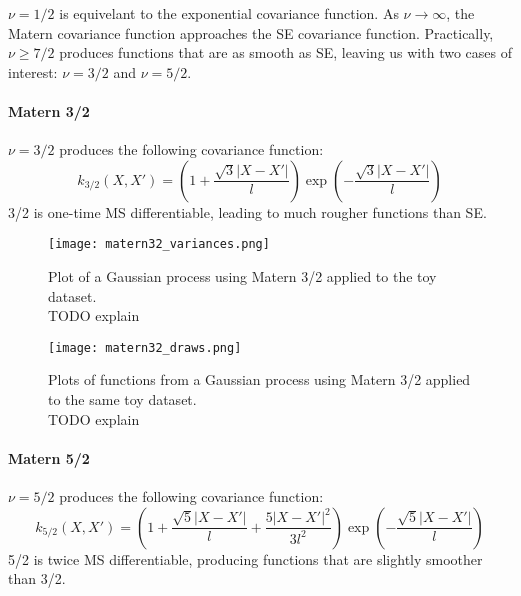 $\nu = 1/2$ is equivelant to the exponential covariance function. As $\nu \to \infty$, the Matern covariance function approaches the SE covariance function. Practically, $\nu \geq 7/2$ produces functions that are as smooth as SE, leaving us with two cases of interest: $\nu = 3/2$ and $\nu = 5/2$.

\paragraph{Matern 3/2}
$\nu = 3/2$ produces the following covariance function:
\begin{equation*}
    k_{3/2}(X,X') = \left(1 + \frac{\sqrt{3}|X - X'|}{l} \right) \exp \left(-\frac{\sqrt{3}|X - X'|}{l} \right)
\end{equation*}
3/2 is one-time MS differentiable, leading to much rougher functions than SE.

\begin{figure}[H]
    \texttt{[image: matern32\_variances.png]}
    \caption{
        Plot of a Gaussian process using Matern 3/2 applied to the toy dataset. \\
        TODO explain
    }
\end{figure}

\begin{figure}[H]
    \texttt{[image: matern32\_draws.png]}
    \caption{
        Plots of functions from a Gaussian process using Matern 3/2 applied to the same toy dataset. \\
        TODO explain
    }
\end{figure}


\paragraph{Matern 5/2}
$\nu = 5/2$ produces the following covariance function:
\begin{equation*}
    k_{5/2}(X,X') = \left(1 + \frac{\sqrt{5}|X - X'|}{l} + \frac{5|X - X'|^2}{3l^2} \right) \exp \left(-\frac{\sqrt{5}|X - X'|}{l} \right)
\end{equation*}
5/2 is twice MS differentiable, producing functions that are slightly smoother than 3/2.

